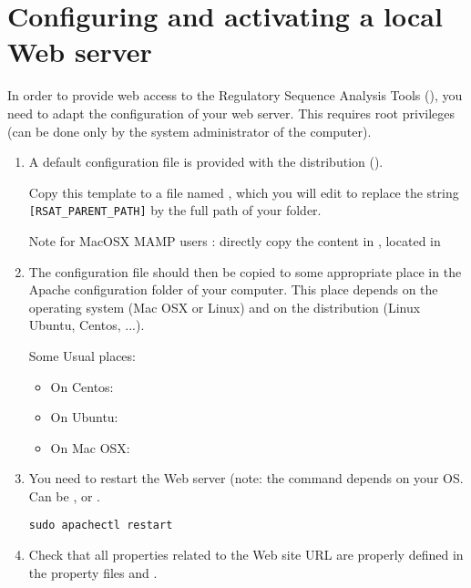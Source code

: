 \section{Configuring and activating a local \RSAT Web server}

In order to provide web access to the Regulatory Sequence Analysis
Tools (\RSAT), you need to adapt the configuration of your web
server. This requires root privileges (can be done only by the system
administrator of the computer).


\begin{enumerate}
\item A default configuration file is provided with the \RSAT
  distribution (). 

  Copy this template to a file named , which you will
  edit to replace the string \texttt{[RSAT\_PARENT\_PATH]} by the
  full path of your  folder.
  
  Note for MacOSX MAMP users : directly copy the content in , located in 
  
\item The configuration file should then be copied to some appropriate
  place in the Apache configuration folder of your computer. This
  place depends on the operating system (Mac OSX or Linux) and on the
  distribution (Linux Ubuntu, Centos, ...).
  
  Some Usual places:
  \begin{itemize}
  \item On Centos: 
  \item On Ubuntu: 
  \item On Mac OSX: 
  \end{itemize}
  
\item You need to restart the Web server (note: the command depends on
  your OS. Can be ,  or
  .

  \begin{lstlisting}
sudo apachectl restart
  \end{lstlisting}


\item Check that all properties related to the Web site URL are
  properly defined in the \RSAT property files
   and
  . 


\end{enumerate}
